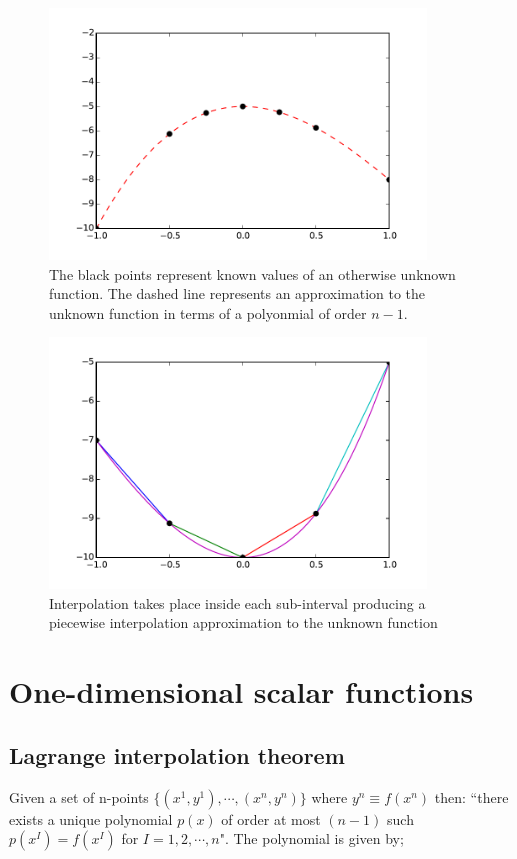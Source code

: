 \begin{figure}[H]
\centering
\includegraphics[width=10cm]{img/interpol1.pdf}
\caption{The black points represent known values of an otherwise unknown function. The dashed line represents an approximation to the unknown function in terms of a polyonmial of order $n-1$.}
\label{fig:interpol1}
\end{figure}

\begin{figure}[H]
\centering
\includegraphics[width=10cm]{img/interpol2.pdf}
\caption{Interpolation takes place inside each sub-interval producing a piecewise interpolation approximation to the unknown function}
\label{fig:interpol2}
\end{figure}

\section{One-dimensional scalar functions}
\subsection{Lagrange interpolation theorem}
Given a set of n-points $\{ (x^1, y^1),\cdots,(x^n, y^n)\}$ where $y^n \equiv f({x^n})$ then: ``there exists a unique polynomial $p(x)$ of order at most $(n-1)$ such $p(x^I) = f(x^I)$ for $I=1,2,\cdots,n$". The polynomial is given by;

